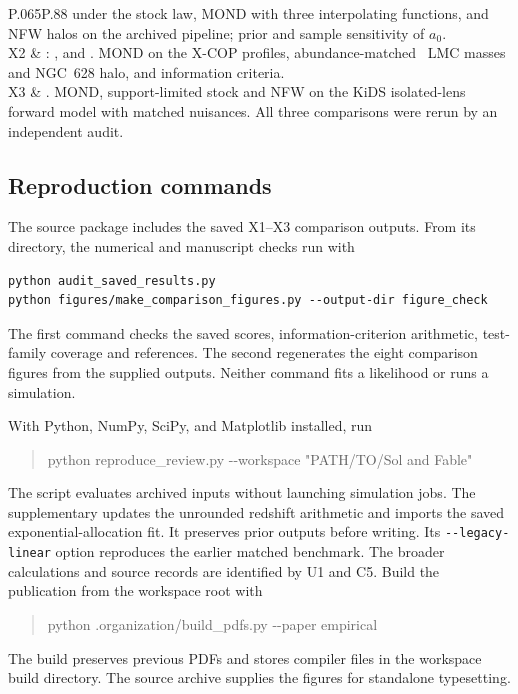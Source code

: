 \begin{longtable}{P{.065\textwidth}P{.88\textwidth}}
under the stock law, MOND with three interpolating functions, and NFW halos
on the archived pipeline; prior and sample sensitivity of $a_0$. \\
X2 & : ,
 and . MOND on the X-COP profiles,
abundance-matched \LCDM\ LMC masses and NGC~628 halo, and information
criteria. \\
X3 & . MOND,
support-limited stock and NFW on the KiDS isolated-lens forward model with
matched nuisances. All three comparisons were rerun by an independent
audit. \\
\bottomrule
\end{longtable}
\normalsize

\subsection{Reproduction commands}

The source package includes the saved X1--X3 comparison outputs. From its
directory, the numerical and manuscript checks run with
\begin{verbatim}
python audit_saved_results.py
python figures/make_comparison_figures.py --output-dir figure_check
\end{verbatim}
The first command checks the saved scores, information-criterion arithmetic,
test-family coverage and references. The second regenerates the eight
comparison figures from the supplied outputs. Neither command fits a
likelihood or runs a simulation.


With Python, NumPy, SciPy, and Matplotlib installed, run
\begin{quote}\ttfamily
python reproduce\_review.py -{}-workspace "PATH/TO/Sol and Fable"
\end{quote}
The script evaluates archived inputs without launching simulation jobs.
The supplementary  updates the
unrounded redshift arithmetic and imports the saved exponential-allocation
fit. It preserves prior outputs before writing. Its
\texttt{-{}-legacy-linear} option reproduces the earlier matched benchmark.
The broader calculations and source records are identified by U1 and C5.
Build the publication from
the workspace root with
\begin{quote}\ttfamily
python .organization/build\_pdfs.py -{}-paper empirical
\end{quote}
The build preserves previous PDFs and stores compiler files in the
workspace build directory. The source archive supplies the figures for
standalone typesetting.

